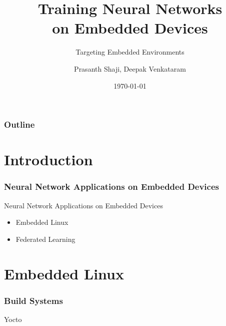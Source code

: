 \documentclass{beamer}
\title{Training Neural Networks \\ on Embedded Devices}
\subtitle{Targeting Embedded Environments}
\author[Prasanth Shaji, Deepak Venkataram] %
{Prasanth Shaji, Deepak Venkataram}
\institute[Dept. of Information Technology] %
{
  Thesis \\
  Uppsala University
}
\date[HDR-NN] %
{\today}
\begin{document}
\begin{frame}[plain] %
  \titlepage
\end{frame}

\begin{frame}
    \frametitle{Outline}
    \tableofcontents[currentsection]
\end{frame}

\section{Introduction}

\begin{frame}
  \frametitle{Neural Network Applications on Embedded Devices}

  Neural Network Applications on Embedded Devices

  \begin{itemize}
    \item Embedded Linux
    \item Federated Learning
  \end{itemize}

\end{frame}

\section{Embedded Linux}

\begin{frame}
  \frametitle{Build Systems}


  Yocto



\end{frame}
\end{document}
